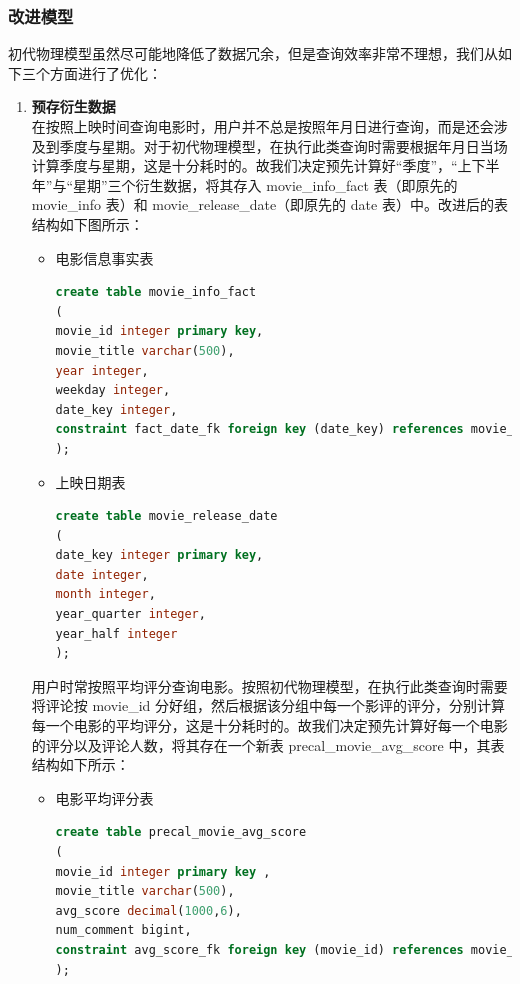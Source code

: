 \documentclass{ctexrep}
\begin{document}
	\subsubsection{改进模型} \label{mysql:2}
    初代物理模型虽然尽可能地降低了数据冗余，但是查询效率非常不理想，我们从如下三个方面进行了优化：
    \begin{enumerate}
        \item \textbf{预存衍生数据}\\
        在按照上映时间查询电影时，用户并不总是按照年月日进行查询，而是还会涉及到季度与星期。对于初代物理模型，在执行此类查询时需要根据年月日当场计算季度与星期，这是十分耗时的。故我们决定预先计算好“季度”，“上下半年”与“星期”三个衍生数据，将其存入 movie\_info\_fact 表（即原先的 movie\_info 表）和 movie\_release\_date（即原先的 date 表）中。改进后的表结构如下图所示：
        \begin{itemize}
            \item 电影信息事实表
                \begin{lstlisting}[language=sql]
create table movie_info_fact
(
movie_id integer primary key,
movie_title varchar(500),
year integer,
weekday integer,
date_key integer,
constraint fact_date_fk foreign key (date_key) references movie_release_date(date_key)
);
                \end{lstlisting}
            \item 上映日期表
                \begin{lstlisting}[language=sql]
create table movie_release_date
(
date_key integer primary key,
date integer,
month integer,
year_quarter integer,
year_half integer
);
                \end{lstlisting}
        \end{itemize}
        用户时常按照平均评分查询电影。按照初代物理模型，在执行此类查询时需要将评论按 movie\_id 分好组，然后根据该分组中每一个影评的评分，分别计算每一个电影的平均评分，这是十分耗时的。故我们决定预先计算好每一个电影的评分以及评论人数，将其存在一个新表 precal\_movie\_avg\_score 中，其表结构如下所示：
        \begin{itemize}
            \item 电影平均评分表
                \begin{lstlisting}[language=sql]
create table precal_movie_avg_score
(
movie_id integer primary key ,
movie_title varchar(500),
avg_score decimal(1000,6),
num_comment bigint,
constraint avg_score_fk foreign key (movie_id) references movie_info_fact(movie_id)
);
                \end{lstlisting}

\end{itemize}
\end{enumerate}
\end{document}
